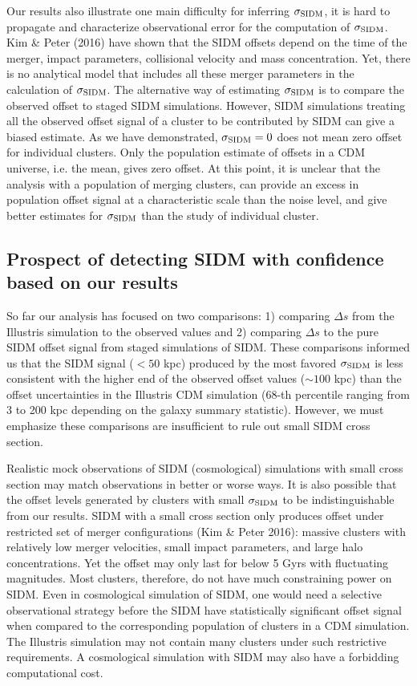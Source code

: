 Our results also illustrate one main difficulty for inferring $\sigma_{\rm
SIDM}$, it is hard to propagate and characterize observational error  
for the computation of $\sigma_{\rm SIDM}$. Kim \& Peter (2016) have shown 
that the SIDM offsets depend on the time of the 
merger, impact parameters, collisional velocity and mass concentration. 
Yet, there is no analytical model that includes all these merger
parameters in the calculation of $\sigma_{\rm SIDM}$.  
The alternative way of estimating $\sigma_{\rm SIDM}$ is to compare the observed
offset to staged SIDM simulations.
However, SIDM simulations treating all the observed offset signal of a cluster 
to be contributed by SIDM can give a biased estimate.  
As we have demonstrated, $\sigma_{\rm SIDM} = 0$ does not mean zero offset for
individual clusters.  
Only the population estimate of offsets in a CDM universe, i.e. the mean,
gives zero offset.  
At this point, it is unclear that the analysis with a population of
merging clusters, can provide an excess in population offset signal at a
characteristic scale than the noise level, and give 
better estimates for $\sigma_{\rm
SIDM}$ than the study of individual cluster.  


\subsection{Prospect of detecting SIDM with confidence based on our results} 
\label{subsec:limitation_of_pvalue}
  
So far our analysis has focused on two comparisons: 1) comparing $\Delta s$ from
the Illustris simulation to the observed values and 2) comparing $\Delta s$ to  
the pure SIDM offset signal from staged simulations of SIDM. 
These comparisons informed us that the SIDM signal ($< 50$ kpc) produced by the most favored
$\sigma_{\rm SIDM}$ is less consistent with the higher end of the observed offset values ($\sim
100$ kpc) than the offset uncertainties in the Illustris CDM simulation (68-th 
percentile ranging from 3 to 200 kpc depending on the galaxy summary statistic).
However, we must emphasize these comparisons are
insufficient to rule out small SIDM cross section.  

Realistic mock observations of SIDM (cosmological) simulations 
with small cross section may match observations in better or worse ways. 
It is also possible that the offset levels generated by clusters with small $\sigma_{\rm SIDM}$ 
to be indistinguishable from our results. 
SIDM with a small cross section only produces offset under restricted set of 
merger configurations (Kim \& Peter 2016): 
massive clusters with relatively low merger velocities, small impact
parameters, and large halo concentrations. Yet the offset may only last
for below 5 Gyrs with fluctuating magnitudes.  
Most clusters, therefore, do not have much constraining power on SIDM.
Even in cosmological simulation of SIDM, one would need a selective observational strategy
before the SIDM have statistically significant offset signal when compared 
to the corresponding population of clusters in a CDM simulation. 
The Illustris simulation may not contain many clusters under 
such restrictive requirements. A cosmological simulation with SIDM 
may also have a forbidding computational cost.
 
